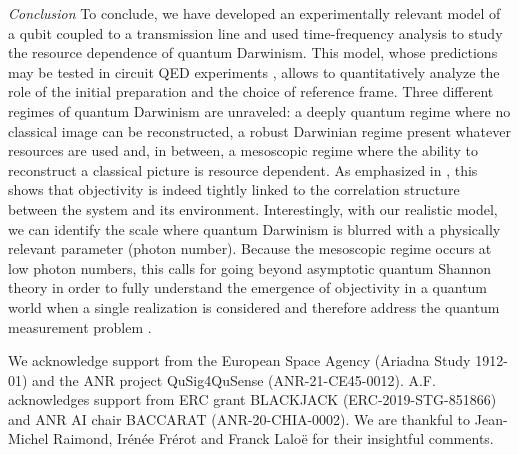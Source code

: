 \emph{Conclusion}
To conclude, we have developed an experimentally relevant model of
a qubit coupled to a transmission line and used time-frequency
analysis to study the resource dependence of quantum Darwinism.
This model, whose predictions may be tested in circuit QED
experiments \cite{Blais-2021-1}, allows to quantitatively analyze the role
of the initial preparation and the choice of reference frame.
Three different regimes of quantum Darwinism
are unraveled: a deeply quantum regime where no classical image can
be reconstructed, a robust Darwinian regime present whatever resources
are used and, in between, a mesoscopic regime where the ability to 
reconstruct a classical picture is resource dependent. 
As emphasized in \cite{Giacomini-2019-1,Le-2020-1,Tuziemski-2020-1}, 
this shows that objectivity is indeed tightly linked to the correlation 
structure between the system and its environment. Interestingly, 
with our realistic model, we can identify the scale where
quantum Darwinism is blurred with a physically relevant parameter 
(photon number). Because the mesoscopic regime occurs at low photon 
numbers, this calls for going beyond asymptotic quantum 
Shannon theory in order to fully understand the 
emergence of objectivity in a quantum world when a single
realization is considered and therefore address the quantum
measurement problem \cite{Book-von-Neumann,Schlosshauer-2005-1}.

\begin{acknowledgments}
We acknowledge support from the European Space Agency (Ariadna Study
1912-01) and the ANR project 
QuSig4QuSense (ANR-21-CE45-0012).
A.F. acknowledges support from ERC grant BLACKJACK (ERC-2019-STG-851866) 
and ANR AI chair BACCARAT (ANR-20-CHIA-0002).
We are thankful to Jean-Michel Raimond, Irénée Frérot and Franck
Laloë for their insightful comments.
\end{acknowledgments}

